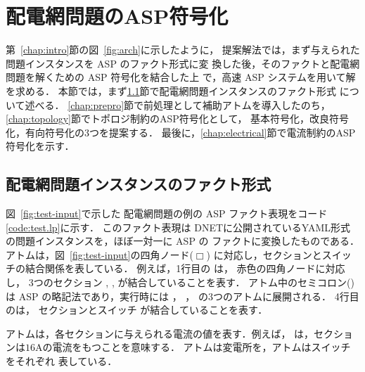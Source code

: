 ﻿\section{配電網問題のASP符号化}\label{chap:encode}

第~\ref{chap:intro}節の図~\ref{fig:arch}に示したように，
提案解法では，まず与えられた問題インスタンスを ASP のファクト形式に変
換した後，そのファクトと配電網問題を解くための ASP 符号化を結合した上
で，高速 ASP システム{\clingo}を用いて解を求める．
%
本節では，まず\ref{chap:fact}節で配電網問題インスタンスのファクト形式
について述べる．
\ref{chap:prepro}節で前処理として補助アトムを導入したのち，
\ref{chap:topology}節でトポロジ制約のASP符号化として，
基本符号化，改良符号化，有向符号化の3つを提案する．
最後に，\ref{chap:electrical}節で電流制約のASP符号化を示す．

\subsection{配電網問題インスタンスのファクト形式}\label{chap:fact}



図~\ref{fig:test-input}で示した
配電網問題の例の ASP ファクト表現をコード\ref{code:test.lp}に示す．
このファクト表現は
DNETに公開されているYAML形式の問題インスタンスを，ほぼ一対一に ASP の
ファクトに変換したものである．
%
アトムは，図~\ref{fig:test-input}の四角ノード($\Box$)
に対応し，セクションとスイッチの結合関係を表している．
例えば，1行目の
は，
赤色の四角ノードに対応し，
3つのセクション
, , 
が結合していることを表す．
アトム中のセミコロン(\code{;})は ASP の略記法であり，実行時には
，
，
の3つのアトムに展開される．
%
4行目のは，
セクションとスイッチ
が結合していることを表す．

アトムは，各セクションに与えられる電流の値を表す．例えば，
は，セクションは$16$Aの電流をもつことを意味する．
%
アトムは変電所を，アトムはスイッチをそれぞれ
表している．


